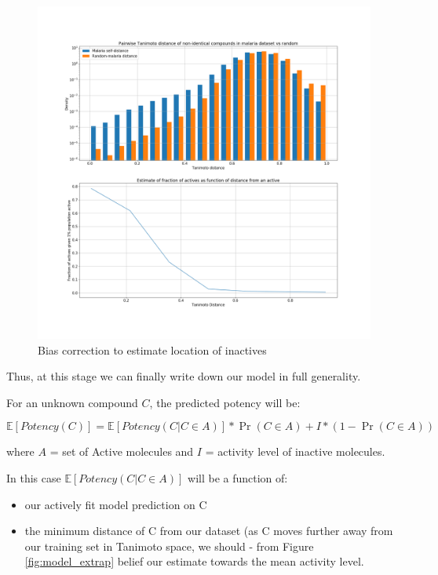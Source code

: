\documentclass{article}
\begin{document}
\begin{figure}
    \centering
    \includegraphics[width=\textwidth]{fig5_bias_correction.png}
    \caption{Bias correction to estimate location of inactives}
    \label{fig:mal_cluster}
\end{figure}
\newline
\newline

Thus, at this stage we can finally write down our model in full generality.

For an unknown compound $C$, the predicted potency will be:

\begin{equation}
    \mathbb{E}[Potency(C)] = \mathbb{E}[Potency(C | C \in A)] * \Pr(C \in A) + I * (1-\Pr(C \in A))   
\end{equation}

where $A$ = set of Active molecules and $I$ = activity level of inactive molecules.

In this case $\mathbb{E}[Potency(C | C \in A)]$ will be a function of: \begin{itemize}
    \item our actively fit model prediction on C
    \item the minimum distance of C from our dataset (as C moves further away from our training set in Tanimoto space, we should - from Figure \ref{fig:model_extrap} belief our estimate towards the mean activity level.
\end{itemize}
\end{document}
